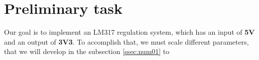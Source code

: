 \section{Preliminary task}
Our goal is to implement an LM317 regulation system, which has an input of \textbf{5V} and an output of \textbf{3V3}. To accomplish that, we must scale different parameters, that we will develop in the subsection \ref{ssec:num01} to 

\clearpage